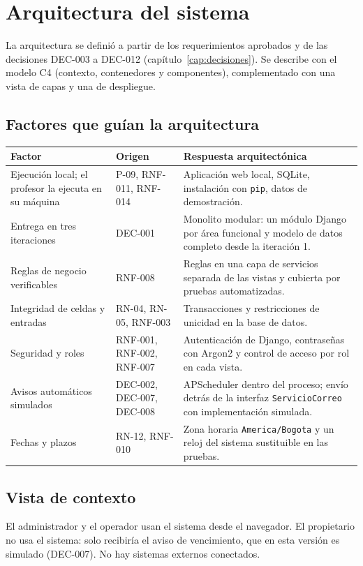 \chapter{Arquitectura del sistema}\label{cap:arquitectura}

La arquitectura se definió a partir de los requerimientos aprobados y de las decisiones DEC-003 a DEC-012 (capítulo~\ref{cap:decisiones}). Se describe con el modelo C4 (contexto, contenedores y componentes), complementado con una vista de capas y una de despliegue.

\section{Factores que guían la arquitectura}
\begin{longtable}{>{\raggedright\arraybackslash}p{4.2cm}>{\raggedright\arraybackslash}p{3.2cm}>{\raggedright\arraybackslash}p{7cm}}
\toprule
\textbf{Factor} & \textbf{Origen} & \textbf{Respuesta arquitectónica}\\
\midrule\endhead
Ejecución local; el profesor la ejecuta en su máquina & P-09, RNF-011, RNF-014 & Aplicación web local, SQLite, instalación con \texttt{pip}, datos de demostración.\\
Entrega en tres iteraciones & DEC-001 & Monolito modular: un módulo Django por área funcional y modelo de datos completo desde la iteración 1.\\
Reglas de negocio verificables & RNF-008 & Reglas en una capa de servicios separada de las vistas y cubierta por pruebas automatizadas.\\
Integridad de celdas y entradas & RN-04, RN-05, RNF-003 & Transacciones y restricciones de unicidad en la base de datos.\\
Seguridad y roles & RNF-001, RNF-002, RNF-007 & Autenticación de Django, contraseñas con Argon2 y control de acceso por rol en cada vista.\\
Avisos automáticos simulados & DEC-002, DEC-007, DEC-008 & APScheduler dentro del proceso; envío detrás de la interfaz \texttt{ServicioCorreo} con implementación simulada.\\
Fechas y plazos & RN-12, RNF-010 & Zona horaria \texttt{America/Bogota} y un reloj del sistema sustituible en las pruebas.\\
\bottomrule
\end{longtable}

\section{Vista de contexto}
El administrador y el operador usan el sistema desde el navegador. El propietario no usa el sistema: solo recibiría el aviso de vencimiento, que en esta versión es simulado (DEC-007). No hay sistemas externos conectados.

